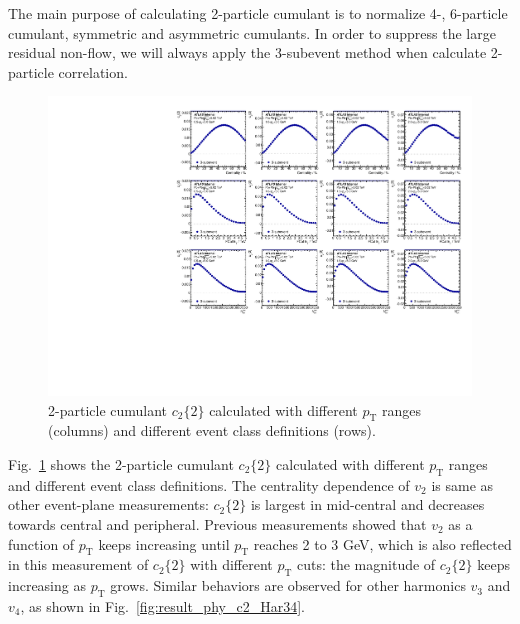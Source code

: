 The main purpose of calculating 2-particle cumulant is to normalize 4-, 6-particle cumulant, symmetric and asymmetric cumulants. In order to suppress the large residual non-flow, we will always apply the 3-subevent method when calculate 2-particle correlation.
\begin{figure}[H]
\centering
\includegraphics[width=.95\linewidth]{figs/sec_result/forQM/phy_c2_Har2.pdf}
\caption{2-particle cumulant $c_2\{2\}$ calculated with different $p_\text{T}$ ranges (columns) and different event class definitions (rows).}
\label{fig:result_phy_c2_Har2}
\end{figure}
Fig.~\ref{fig:result_phy_c2_Har2} shows the 2-particle cumulant $c_2\{2\}$ calculated with different $p_\text{T}$ ranges and different event class definitions. The centrality dependence of $v_2$ is same as other event-plane measurements: $c_2\{2\}$ is largest in mid-central and decreases towards central and peripheral. Previous measurements showed that $v_2$ as a function of $p_\text{T}$ keeps increasing until $p_\text{T}$ reaches 2 to 3 GeV, which is also reflected in this measurement of $c_2\{2\}$ with different $p_\text{T}$ cuts: the magnitude of $c_2\{2\}$ keeps increasing as $p_\text{T}$ grows. Similar behaviors are observed for other harmonics $v_3$ and $v_4$, as shown in Fig.~\ref{fig:result_phy_c2_Har34}.

